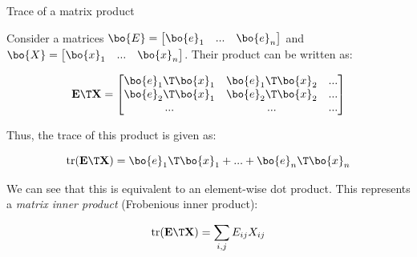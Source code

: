 \documentclass{beamer}
\begin{document}
\begin{frame}{Trace of a matrix product}
	\begin{flushleft}
		
		Consider a matrices $\bo{E} = \begin{bmatrix}
			\bo{e}_1 & ... & \bo{e}_n
		\end{bmatrix}$ and 
		$\bo{X} = \begin{bmatrix}
			\bo{x}_1 & ... & \bo{x}_n
		\end{bmatrix}$. Their product can be written as:
		
		\begin{equation}
			\mathbf{E}\T \mathbf{X} = 
			\begin{bmatrix}
				\bo{e}_1 \T \bo{x}_1 & \bo{e}_1 \T \bo{x}_2 & ... \\
				\bo{e}_2 \T \bo{x}_1 & \bo{e}_2 \T \bo{x}_2 & ... \\
				... & ... & ... 
			\end{bmatrix}
		\end{equation}
		
		Thus, the trace of this product is given as:
		
		\begin{equation}
			\text{tr}(\mathbf{E}\T\mathbf{X}) =  \bo{e}_1 \T \bo{x}_1 + ... + \bo{e}_n \T \bo{x}_n
		\end{equation}
		
		We can see that this is equivalent to an element-wise dot product. This represents a \emph{matrix inner product} (Frobenious inner product):
		
		\begin{equation}
			\text{tr}(\mathbf{E}\T\mathbf{X}) =  \sum_{i,j} E_{ij} X_{ij}
		\end{equation}
		
		
		
	\end{flushleft}
\end{frame}
\end{document}
